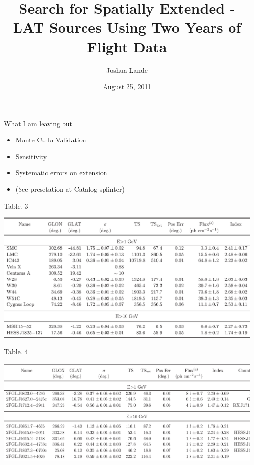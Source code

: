 \documentclass[12pt]{beamer}
\title{Search for Spatially Extended \fermi-LAT Sources Using Two Years of Flight
Data}
\author{Joshua Lande}
\institute{SLAC/Stanford}
\date{August 25, 2011}
\begin{document}



\begin{frame}{What I am leaving out}
  \begin{itemize}
  \item Monte Carlo Validation
  \item Sensitivity
  \item Systematic errors on extension
  \item (See presetation at Catalog splinter)
  \end{itemize}
\end{frame}

\begin{frame}{Table. 3}
  \begin{center}
    \includegraphics[scale=0.5]{tables/table3.eps}
  \end{center}
\end{frame}

\begin{frame}{Table. 4}
  \begin{center}
    \includegraphics[scale=0.5]{tables/table4.eps}
  \end{center}
\end{frame}
\end{document}
